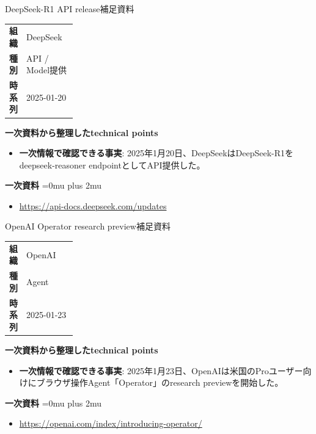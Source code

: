 \begin{technicalnote}{DeepSeek-R1 API release}{補足資料}
\begingroup
\begin{tabularx}{\linewidth}{@{}>{\bfseries}p{0.22\linewidth}X@{}}
組織 & DeepSeek \\
種別 & API / Model提供 \\
時系列 & 2025-01-20 \\
\end{tabularx}
\smallskip
\begin{minipage}{\linewidth}
{\bfseries 一次資料から整理したtechnical points}
\begin{itemize}[leftmargin=1.5em,itemsep=0.35em]
\item \textbf{一次情報で確認できる事実}: 2025年1月20日、DeepSeekはDeepSeek-R1をdeepseek-reasoner endpointとしてAPI提供した。
\end{itemize}
\begin{samepage}
{\bfseries 一次資料}
\begingroup\sloppy
\Urlmuskip=0mu plus 2mu\relax
\begin{itemize}[leftmargin=1.5em,itemsep=0.25em]
\item {\scriptsize\url{https://api-docs.deepseek.com/updates}}
\end{itemize}
\endgroup
\end{samepage}
\end{minipage}
\endgroup
\end{technicalnote}
\medskip

\begin{technicalnote}{OpenAI Operator research preview}{補足資料}
\begingroup
\begin{tabularx}{\linewidth}{@{}>{\bfseries}p{0.22\linewidth}X@{}}
組織 & OpenAI \\
種別 & Agent \\
時系列 & 2025-01-23 \\
\end{tabularx}
\smallskip
\begin{minipage}{\linewidth}
{\bfseries 一次資料から整理したtechnical points}
\begin{itemize}[leftmargin=1.5em,itemsep=0.35em]
\item \textbf{一次情報で確認できる事実}: 2025年1月23日、OpenAIは米国のProユーザー向けにブラウザ操作Agent「Operator」のresearch previewを開始した。
\end{itemize}
\begin{samepage}
{\bfseries 一次資料}
\begingroup\sloppy
\Urlmuskip=0mu plus 2mu\relax
\begin{itemize}[leftmargin=1.5em,itemsep=0.25em]
\item {\scriptsize\url{https://openai.com/index/introducing-operator/}}
\end{itemize}
\endgroup
\end{samepage}
\end{minipage}
\endgroup
\end{technicalnote}
\medskip

